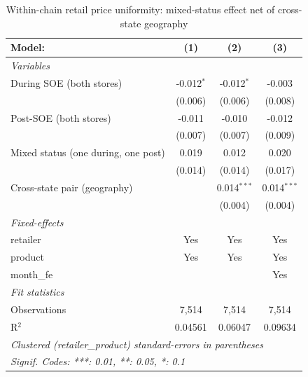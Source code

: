 
\begin{table}[htbp]
   \caption{\label{tab:uniformity_retail_crossstate} Within-chain retail price uniformity: mixed-status effect net of cross-state geography}
   \centering
   \begin{tabular}{lccc}
      \tabularnewline \midrule \midrule
      Model:                              & (1)          & (2)           & (3)\\  
      \midrule
      \emph{Variables}\\
      During SOE (both stores)            & -0.012$^{*}$ & -0.012$^{*}$  & -0.003\\   
                                          & (0.006)      & (0.006)       & (0.008)\\   
      Post-SOE (both stores)              & -0.011       & -0.010        & -0.012\\   
                                          & (0.007)      & (0.007)       & (0.009)\\   
      Mixed status (one during, one post) & 0.019        & 0.012         & 0.020\\   
                                          & (0.014)      & (0.014)       & (0.017)\\   
      Cross-state pair (geography)        &              & 0.014$^{***}$ & 0.014$^{***}$\\   
                                          &              & (0.004)       & (0.004)\\   
      \midrule
      \emph{Fixed-effects}\\
      retailer                            & Yes          & Yes           & Yes\\  
      product                             & Yes          & Yes           & Yes\\  
      month\_fe                           &              &               & Yes\\  
      \midrule
      \emph{Fit statistics}\\
      Observations                        & 7,514        & 7,514         & 7,514\\  
      R$^2$                               & 0.04561      & 0.06047       & 0.09634\\  
      \midrule \midrule
      \multicolumn{4}{l}{\emph{Clustered (retailer\_product) standard-errors in parentheses}}\\
      \multicolumn{4}{l}{\emph{Signif. Codes: ***: 0.01, **: 0.05, *: 0.1}}\\
   \end{tabular}
   

\end{table}
